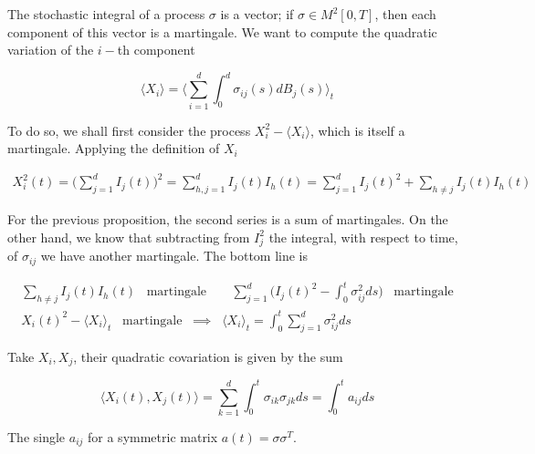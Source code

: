 The stochastic integral of a process $\sigma$ is a vector; if $\sigma \in M^2[0,T]$, then each component of this vector is a martingale. We want to compute the quadratic variation of the $i-$th component

\begin{equation*}
    \langle X_i \rangle = \Big\langle \sum_{i=1}^d \int_0^d \sigma_{ij}(s) dB_j(s) \Big\rangle_t
\end{equation*}

To do so, we shall first consider the process $X_i^2 - \langle X_i \rangle$, which is itself a martingale. Applying the definition of $X_i$

\begin{gather*}
    X_i^2(t) = \Bigg( \sum_{j=1}^d I_j(t) \Bigg)^2 = \sum_{h,j = 1}^d I_j(t) I_h(t) = \sum_{j=1}^d I_j(t)^2 + \sum_{h \neq j} I_j(t) I_h(t)
\end{gather*}

For the previous proposition, the second series is a sum of martingales. On the other hand, we know that subtracting from $I_j^2$ the integral, with respect to time, of $\sigma_{ij}$ we have another martingale. The bottom line is

\begin{gather*}
    \sum_{h \neq j} I_j(t)I_h(t) \;\;\; \text{martingale} \;\;\;\;\;\;\; \sum_{j=1}^d \Bigg( I_j(t)^2 - \int_0^t \sigma_{ij}^2 ds \Bigg) \;\;\; \text{martingale} \\
    X_i(t)^2 - \langle X_i \rangle_t \;\;\; \text{martingale} \;\; \implies \;\; \langle X_i \rangle_t = \int_0^t \sum_{j=1}^d \sigma_{ij}^2 ds 
\end{gather*}

Take $X_i,X_j$, their quadratic covariation is given by the sum

\begin{equation*}
    \big\langle X_i(t), X_j(t) \big\rangle = \sum_{k=1}^d \int_0^t \sigma_{ik} \sigma_{jk} ds = \int_0^t a_{ij} ds
\end{equation*}

The single $a_{ij}$ for a symmetric matrix $a(t) = \sigma \sigma^T$.

